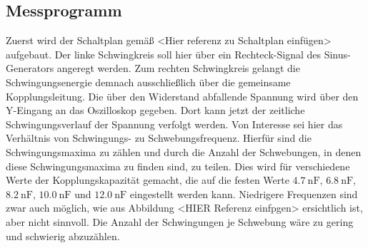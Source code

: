 \subsection{Messprogramm}
Zuerst wird der Schaltplan gemäß <Hier referenz zu Schaltplan einfügen> aufgebaut. 
Der linke Schwingkreis soll hier über ein Rechteck-Signal des Sinus-Generators angeregt werden. 
Zum rechten Schwingkreis gelangt die Schwingungsenergie demnach ausschließlich über die gemeinsame Kopplungsleitung. 
Die über den Widerstand abfallende Spannung wird über den Y-Eingang an das Oszilloskop gegeben. 
Dort kann jetzt der zeitliche Schwingungsverlauf der Spannung verfolgt werden. 
Von Interesse sei hier das Verhältnis von Schwingungs- zu Schwebungsfrequenz. 
Hierfür sind die Schwingungsmaxima zu zählen und durch die Anzahl der Schwebungen, in denen diese Schwingungsmaxima zu finden 
sind, zu teilen. 
Dies wird für verschiedene Werte der Kopplungskapazität gemacht, die auf die festen Werte $\SI{4.7}{\nano\farad}$, 
$\SI{6.8}{\nano\farad}$, $\SI{8.2}{\nano\farad}$, $\SI{10.0}{\nano\farad}$ und $\SI{12.0}{\nano\farad}$ eingestellt werden kann.
Niedrigere Frequenzen sind zwar auch möglich, wie aus Abbildung <HIER Referenz einfpgen> ersichtlich ist, aber nicht sinnvoll. 
Die Anzahl der Schwingungen je Schwebung wäre zu gering und schwierig abzuzählen. 

